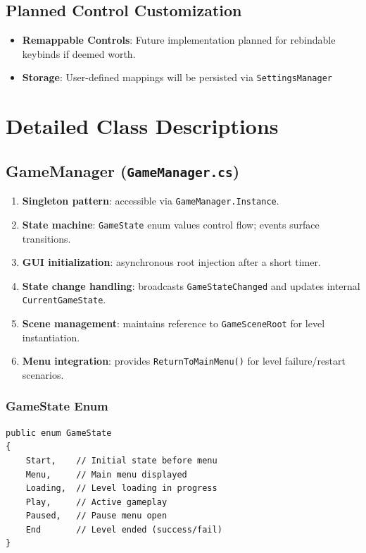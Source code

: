 \documentclass{report}
\begin{document}
\section{Planned Control Customization}
\begin{itemize}[noitemsep]
	\item \textbf{Remappable Controls}: Future implementation planned for rebindable keybinds if deemed worth.
	\item \textbf{Storage}: User-defined mappings will be persisted via \texttt{SettingsManager}
\end{itemize}

\chapter{Detailed Class Descriptions}
\section{GameManager (\texttt{GameManager.cs})}
\begin{enumerate}[label=\alph*)]
	\item\textbf{Singleton pattern}: accessible via \texttt{GameManager.Instance}.
	\item\textbf{State machine}: \texttt{GameState} enum values control flow; events surface transitions.
	\item\textbf{GUI initialization}: asynchronous root injection after a short timer.
	\item\textbf{State change handling}: broadcasts \texttt{GameStateChanged} and updates internal \texttt{CurrentGameState}.
	\item\textbf{Scene management}: maintains reference to \texttt{GameSceneRoot} for level instantiation.
	\item\textbf{Menu integration}: provides \texttt{ReturnToMainMenu()} for level failure/restart scenarios.
\end{enumerate}

\subsection{GameState Enum}
\begin{verbatim}
public enum GameState
{
    Start,    // Initial state before menu
    Menu,     // Main menu displayed
    Loading,  // Level loading in progress
    Play,     // Active gameplay
    Paused,   // Pause menu open
    End       // Level ended (success/fail)
}
\end{verbatim}
\end{document}
